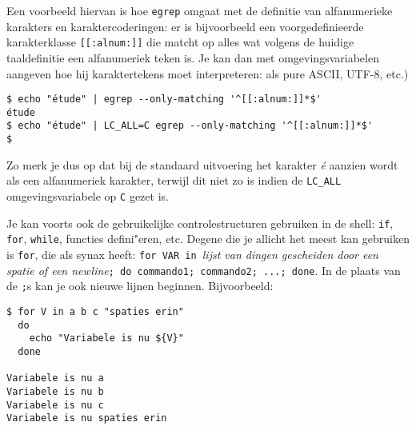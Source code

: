 \documentclass[a4paper,twoside,openany]{memoir}
\begin{document}

Een voorbeeld hiervan is hoe \verb!egrep! omgaat met de definitie van
alfanumerieke karakters en karaktercoderingen: er is bijvoorbeeld een
voorgedefinieerde karakterklasse \verb![[:alnum:]]! die matcht op alles wat
volgens de huidige taaldefinitie een alfanumeriek teken is. Je kan dan met
omgevingsvariabelen aangeven hoe hij karaktertekens moet interpreteren: als
pure ASCII, UTF-8, etc.)

\begin{verbatim}
$ echo "étude" | egrep --only-matching '^[[:alnum:]]*$'
étude
$ echo "étude" | LC_ALL=C egrep --only-matching '^[[:alnum:]]*$'
$
\end{verbatim}

Zo merk je dus op dat bij de standaard uitvoering het karakter \emph{é} aanzien
wordt als een alfanumeriek karakter, terwijl dit niet zo is indien de
\verb!LC_ALL! omgevingsvariabele op \verb!C! gezet is.

Je kan voorts ook de gebruikelijke controlestructuren gebruiken in de shell:
\verb!if!, \verb!for!, \verb!while!, functies defini"eren, etc. Degene die je
allicht het meest kan gebruiken is \verb!for!, die als synax heeft: \verb!for VAR in !\emph{lijst van dingen gescheiden door een spatie of een
newline}\verb!; do commando1; commando2; ...; done!. In de plaats van de
\verb!;!s kan je ook nieuwe lijnen beginnen. Bijvoorbeeld:

\begin{verbatim}
$ for V in a b c "spaties erin"
  do
    echo "Variabele is nu ${V}"
  done

Variabele is nu a
Variabele is nu b
Variabele is nu c
Variabele is nu spaties erin
\end{verbatim}
\end{document}
